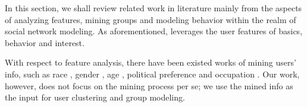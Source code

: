 

In this section, we shall review related work in literature mainly from the aspects of analyzing features, mining groups and modeling behavior within the realm of social network modeling.
As aforementioned, \sys{} leverages the user features of basics, behavior and interest.

With respect to feature analysis, there have been existed works of mining users' info, such as race \cite{IEEEexample:conf/icwsm/PennacchiottiP11}, gender \cite{IEEEexample:conf/emnlp/CiotSR13}, age \cite{IEEEexample:conf/icde/ParkHHL09}, political preference \cite{IEEEexample:conf/icwsm/PennacchiottiP11,IEEEexample:conf/acl/VolkovaCD14,IEEEexample:kosinski2013private} and occupation \cite{IEEEexample:journals/tmm/FangSXH15,IEEEexample:conf/icde/FanCTWC16}.
Our work, however, does not focus on the mining process per se; we use the mined info as the input for user clustering and group modeling.

